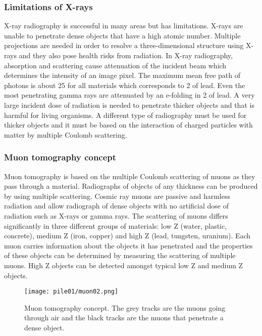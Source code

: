 \documentclass[twoside,titlepage,11pt,twocolumn,a4paper]{article}
\begin{document}
\subsubsection{Limitations of X-rays}
X-ray radiography is successful in many areas but has
limitations. X-rays are unable to penetrate dense objects that have a
high atomic number. Multiple projections are needed in order to
resolve a three-dimensional structure using X-rays and they also pose
health risks from radiation. In X-ray radiography, absorption and
scattering cause attenuation of the incident beam which determines the
intensity of an image pixel. The maximum mean free path of photons is
about \unit{25}{\gram\usk\rpsquare{\centi\metre}} for all materials
which corresponds to \unit{2}{\centi\metre} of lead.
\citep{Borozdin2003} Even the most penetrating gamma rays are
attenuated by an e-folding in \unit{2}{\centi\metre} of lead. A very
large incident dose of radiation is needed to penetrate thicker
objects and that is harmful for living organisms.
\citep{Priedhorsky2003} A different type of radiography must be used
for thicker objects and it must be based on the interaction of charged
particles with matter by multiple Coulomb scattering.
\citep{Borozdin2003}

\subsubsection{Muon tomography concept}
Muon tomography is based on the multiple Coulomb scattering of muons
as they pass through a material. Radiographs of objects of any
thickness can be produced by using multiple scattering.  Cosmic ray
muons are passive and harmless radiation and allow radiograph of dense
objects with no artificial dose of radiation such as X-rays or gamma
rays. The scattering of muons differs significantly in three different
groups of materials: low Z (water, plastic, concrete), medium Z (iron,
copper) and high Z (lead, tungsten, uranium). \citep{imageRec2004}
Each muon carries information about the objects it has penetrated and
the properties of these objects can be determined by measuring the
scattering of multiple muons. High Z objects can be detected amongst
typical low Z and medium Z objects. \citep{statisticalRec2007}

\begin{figure}
  \texttt{[image: pile01/muon02.png]}
  \caption{Muon tomography concept. The grey tracks are the muons
    going through air and the black tracks are the muons that
    penetrate a dense object. \citep{statisticalRec2007}}
  \label{fig:muon02}
\end{figure}
\end{document}
